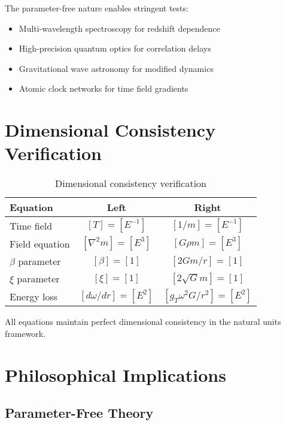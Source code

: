 \documentclass[twocolumn,aps,prl]{revtex4-2}
\begin{document}
	The parameter-free nature enables stringent tests:
	\begin{itemize}
		\item Multi-wavelength spectroscopy for redshift dependence
		\item High-precision quantum optics for correlation delays
		\item Gravitational wave astronomy for modified dynamics
		\item Atomic clock networks for time field gradients
	\end{itemize}
	
	\section{Dimensional Consistency Verification}
	\label{sec:dimensional_verification}
	
	\begin{table}[h!]
		\centering
		\small
		\begin{tabular}{lcc}
			\toprule
			\textbf{Equation} & \textbf{Left} & \textbf{Right} \\
			\midrule
			Time field & \([T] = [E^{-1}]\) & \([1/m] = [E^{-1}]\) \\
			Field equation & \([\nabla^2 m] = [E^3]\) & \([G\rho m] = [E^3]\) \\
			\(\beta\) parameter & \([\beta] = [1]\) & \([2Gm/r] = [1]\) \\
			\(\xi\) parameter & \([\xi] = [1]\) & \([2\sqrt{G}m] = [1]\) \\
			Energy loss & \([d\omega/dr] = [E^2]\) & \([g_T\omega^2 G/r^2] = [E^2]\) \\
			\bottomrule
		\end{tabular}
		\caption{Dimensional consistency verification}
	\end{table}
	
	All equations maintain perfect dimensional consistency in the natural units framework.
	
	\section{Philosophical Implications}
	\label{sec:philosophical_implications}
	
	\subsection{Parameter-Free Theory}
	\label{subsec:parameter_free_theory}
	
\end{document}
